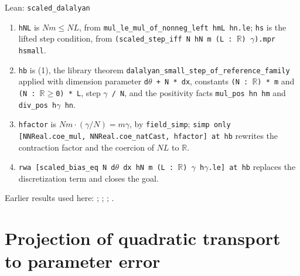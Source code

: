 \documentclass[11pt,a4paper]{report}
\begin{document}
\begin{leanbox}{Lean: \texttt{scaled\_\allowbreak{}dalalyan}}
\begin{enumerate}


\item \texttt{h\allowbreak{}NL} is \(Nm\le NL\), from \texttt{mul\_\allowbreak{}le\_\allowbreak{}mul\_\allowbreak{}of\_\allowbreak{}nonneg\_\allowbreak{}left hm\allowbreak{}L hn.\allowbreak{}le}; \texttt{hs} is the lifted step condition, from \texttt{(scaled\_\allowbreak{}step\_\allowbreak{}iff N h\allowbreak{}N m (L : \ensuremath{\mathbb R}) \ensuremath{\gamma}).\allowbreak{}mpr hsmall}.

\item \texttt{hb} is (1), the library theorem \texttt{dalalyan\_\allowbreak{}small\_\allowbreak{}step\_\allowbreak{}of\_\allowbreak{}reference\_\allowbreak{}family} applied with dimension parameter \texttt{d\ensuremath{\theta} + N * dx}, constants \texttt{(N : \ensuremath{\mathbb R}) * m} and \texttt{(N : \ensuremath{\mathbb R}\ensuremath{\ge}0) * L}, step \texttt{\ensuremath{\gamma} /\allowbreak{} N}, and the positivity facts \texttt{mul\_\allowbreak{}pos hn hm} and \texttt{div\_\allowbreak{}pos h\ensuremath{\gamma} hn}.

\item \texttt{hfactor} is \(Nm\cdot(\gamma/N)=m\gamma\), by \texttt{field\_\allowbreak{}simp}; \texttt{simp only [NNReal.\allowbreak{}coe\_\allowbreak{}mul, NNReal.\allowbreak{}coe\_\allowbreak{}nat\allowbreak{}Cast, hfactor] at hb} rewrites the contraction factor and the coercion of \(NL\) to \(\mathbb R\).

\item \texttt{rwa [scaled\_\allowbreak{}bias\_\allowbreak{}eq N d\ensuremath{\theta} dx h\allowbreak{}N m (L : \ensuremath{\mathbb R}) \ensuremath{\gamma} h\ensuremath{\gamma}.\allowbreak{}le] at hb} replaces the discretization term and closes the goal.

\end{enumerate}
\end{leanbox}


Earlier results used here: \cite[Section~3.17.3]{LangevinLean2026ULASC}; \cite[Section~3.17.4]{LangevinLean2026ULASC}; \cite[Section~3.47.2]{LangevinLean2026ULASC}; \cite[Section~3.47.4]{LangevinLean2026ULASC}.
\section{\texorpdfstring{Projection of quadratic transport to parameter error}{Projection of quadratic transport to parameter error}}
\label{proof-module-IPLA-Transport-lean}
\end{document}
